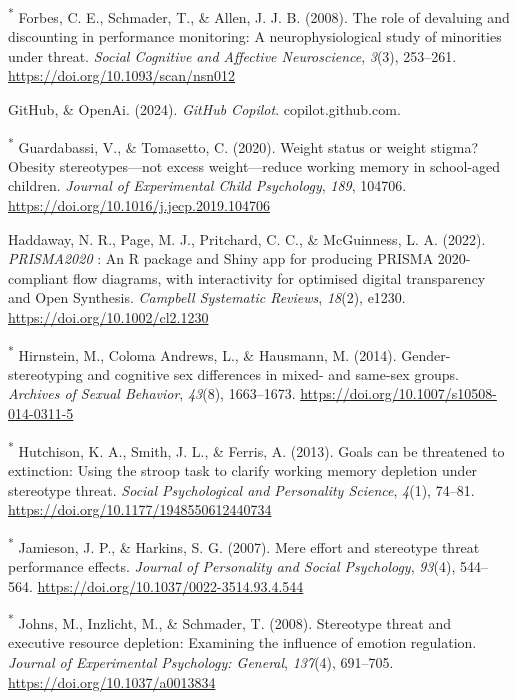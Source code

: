 \documentclass[
  stu,floatsintext]{apa7}
\newlength{\cslhangindent}
\newenvironment{CSLReferences}[2] %
 {\begin{list}{}{%
  \setlength{\itemindent}{0pt}
  \setlength{\leftmargin}{0pt}
  \setlength{\parsep}{0pt}
  \ifodd #1
   \setlength{\leftmargin}{\cslhangindent}
   \setlength{\itemindent}{-1\cslhangindent}
  \fi
  \setlength{\itemsep}{#2\baselineskip}}}
 {\end{list}}
\begin{document}
\begin{CSLReferences}{1}{0}
\textsuperscript{*} Forbes, C. E., Schmader, T., \& Allen, J. J. B. (2008). The role of devaluing and discounting in performance monitoring: A neurophysiological study of minorities under threat. \emph{Social Cognitive and Affective Neuroscience}, \emph{3}(3), 253--261. \url{https://doi.org/10.1093/scan/nsn012}

GitHub, \& OpenAi. (2024). \emph{{GitHub Copilot}}. copilot.github.com.

\textsuperscript{*} Guardabassi, V., \& Tomasetto, C. (2020). Weight status or weight stigma? {Obesity} stereotypes---not excess weight---reduce working memory in school-aged children. \emph{Journal of Experimental Child Psychology}, \emph{189}, 104706. \url{https://doi.org/10.1016/j.jecp.2019.104706}

Haddaway, N. R., Page, M. J., Pritchard, C. C., \& McGuinness, L. A. (2022). {\emph{PRISMA2020}} : {An R} package and {Shiny} app for producing {PRISMA} 2020-compliant flow diagrams, with interactivity for optimised digital transparency and {Open Synthesis}. \emph{Campbell Systematic Reviews}, \emph{18}(2), e1230. \url{https://doi.org/10.1002/cl2.1230}

\textsuperscript{*} Hirnstein, M., Coloma Andrews, L., \& Hausmann, M. (2014). Gender-stereotyping and cognitive sex differences in mixed- and same-sex groups. \emph{Archives of Sexual Behavior}, \emph{43}(8), 1663--1673. \url{https://doi.org/10.1007/s10508-014-0311-5}

\textsuperscript{*} Hutchison, K. A., Smith, J. L., \& Ferris, A. (2013). Goals can be threatened to extinction: {Using} the stroop task to clarify working memory depletion under stereotype threat. \emph{Social Psychological and Personality Science}, \emph{4}(1), 74--81. \url{https://doi.org/10.1177/1948550612440734}

\textsuperscript{*} Jamieson, J. P., \& Harkins, S. G. (2007). Mere effort and stereotype threat performance effects. \emph{Journal of Personality and Social Psychology}, \emph{93}(4), 544--564. \url{https://doi.org/10.1037/0022-3514.93.4.544}

\textsuperscript{*} Johns, M., Inzlicht, M., \& Schmader, T. (2008). Stereotype threat and executive resource depletion: {Examining} the influence of emotion regulation. \emph{Journal of Experimental Psychology: General}, \emph{137}(4), 691--705. \url{https://doi.org/10.1037/a0013834}


\end{CSLReferences}
\end{document}

